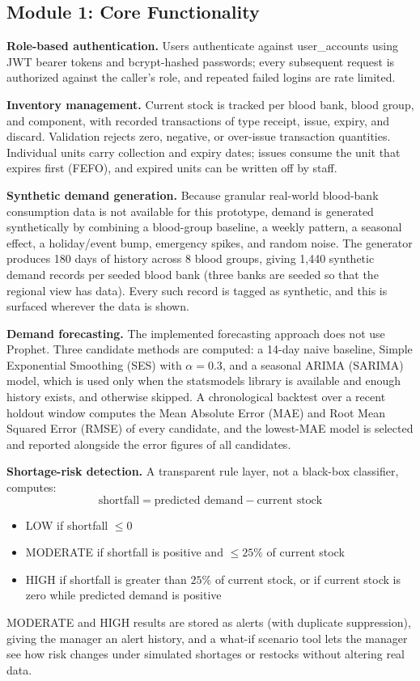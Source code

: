 \documentclass[12pt,a4paper,twoside]{report}
\begin{document}
\subsection{Module 1: Core Functionality}
\textbf{Role-based authentication.} Users authenticate against user\_accounts using JWT bearer tokens and bcrypt-hashed passwords; every subsequent request is authorized against the caller's role, and repeated failed logins are rate limited.

\medskip\noindent\textbf{Inventory management.} Current stock is tracked per blood bank, blood group, and component, with recorded transactions of type receipt, issue, expiry, and discard. Validation rejects zero, negative, or over-issue transaction quantities. Individual units carry collection and expiry dates; issues consume the unit that expires first (FEFO), and expired units can be written off by staff.

\medskip\noindent\textbf{Synthetic demand generation.} Because granular real-world blood-bank consumption data is not available for this prototype, demand is generated synthetically by combining a blood-group baseline, a weekly pattern, a seasonal effect, a holiday/event bump, emergency spikes, and random noise. The generator produces 180 days of history across 8 blood groups, giving 1,440 synthetic demand records per seeded blood bank (three banks are seeded so that the regional view has data). Every such record is tagged as synthetic, and this is surfaced wherever the data is shown.

\medskip\noindent\textbf{Demand forecasting.} The implemented forecasting approach does not use Prophet. Three candidate methods are computed: a 14-day naive baseline, Simple Exponential Smoothing (SES) with $\alpha = 0.3$, and a seasonal ARIMA (SARIMA) model, which is used only when the statsmodels library is available and enough history exists, and otherwise skipped. A chronological backtest over a recent holdout window computes the Mean Absolute Error (MAE) and Root Mean Squared Error (RMSE) of every candidate, and the lowest-MAE model is selected and reported alongside the error figures of all candidates.

\medskip\noindent\textbf{Shortage-risk detection.} A transparent rule layer, not a black-box classifier, computes:
\[ \text{shortfall} = \text{predicted demand} - \text{current stock} \]
\begin{itemize}
\item LOW if shortfall $\le 0$
\item MODERATE if shortfall is positive and $\le 25\%$ of current stock
\item HIGH if shortfall is greater than $25\%$ of current stock, or if current stock is zero while predicted demand is positive
\end{itemize}
MODERATE and HIGH results are stored as alerts (with duplicate suppression), giving the manager an alert history, and a what-if scenario tool lets the manager see how risk changes under simulated shortages or restocks without altering real data.
\end{document}

